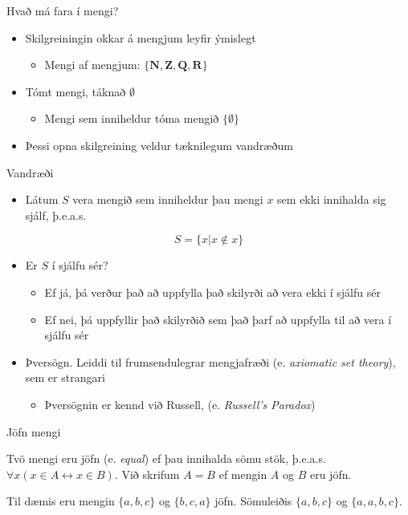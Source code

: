\documentclass[handout]{beamer}
\begin{document}
\begin{frame}{Hvað má fara í mengi?}
\begin{itemize}
 \item Skilgreiningin okkar á mengjum leyfir ýmislegt
 \begin{itemize}
  \item Mengi af mengjum: $\{\mathbf{N}, \mathbf{Z}, \mathbf{Q}, \mathbf{R}\}$
 \end{itemize}
 \item Tómt mengi, táknað $\emptyset$
 \begin{itemize}
  \item Mengi sem inniheldur tóma mengið $\{\emptyset\}$
 \end{itemize}
 \item Þessi opna skilgreining veldur tæknilegum vandræðum
\end{itemize}
\end{frame}

\begin{frame}{Vandræði}
\begin{itemize}
 \item Látum $S$ vera mengið sem inniheldur þau mengi $x$ sem ekki innihalda sig sjálf, þ.e.a.s.
\end{itemize}
\[
 S = \{x | x \notin x\}
\]
\begin{itemize}
 \item Er $S$ í sjálfu sér? \pause
 \begin{itemize}
  \item Ef já, þá verður það að uppfylla það skilyrði að vera ekki í sjálfu sér \pause
  \item Ef nei, þá uppfyllir það skilyrðið sem það þarf að uppfylla til að vera í sjálfu sér \pause
 \end{itemize}
 \item Þversögn. Leiddi til frumsendulegrar mengjafræði (e. \emph{axiomatic set theory}), sem er strangari
 \begin{itemize}
  \item Þversögnin er kennd við Russell, (e. \emph{Russell's Paradox})
 \end{itemize}

\end{itemize}
\end{frame}

\begin{frame}{Jöfn mengi}
\begin{tcolorbox}[title=Jöfn mengi]
Tvö mengi eru jöfn (e. \emph{equal}) ef þau innihalda sömu stök, þ.e.a.s. $\forall x (x \in A \leftrightarrow x \in B ) $. Við skrifum $A = B$ ef mengin $A$ og $B$ eru jöfn.
\end{tcolorbox}
Til dæmis eru mengin $\{a, b, c\}$ og $\{b, c, a\}$ jöfn. Sömuleiðis $\{a, b, c\}$ og $\{a, a, b, c\}$.
\end{frame}
\end{document}
